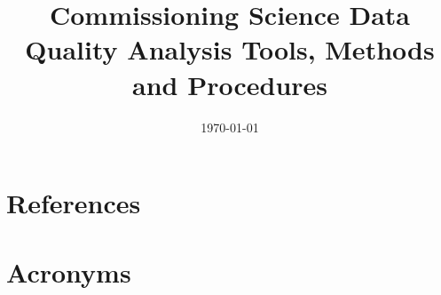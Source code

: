 \documentclass[modern]{aastex62}
\begin{document}

\date{\today}
\title{ Commissioning Science Data Quality Analysis Tools, Methods and Procedures}



%


\appendix

\section{References} \label{sec:bib}



\section{Acronyms} \label{sec:acronyms}

\end{document}
